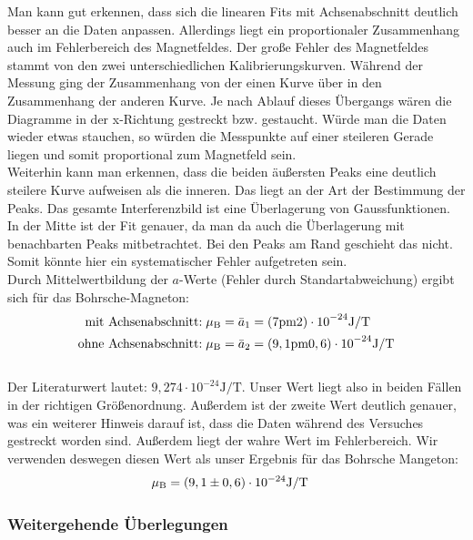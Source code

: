 Man kann gut erkennen, dass sich die linearen Fits mit Achsenabschnitt deutlich besser an die Daten anpassen. Allerdings liegt ein proportionaler Zusammenhang auch im Fehlerbereich des Magnetfeldes. Der große Fehler des Magnetfeldes stammt von den zwei unterschiedlichen Kalibrierungskurven. Während der Messung ging der Zusammenhang von der einen Kurve über in den Zusammenhang der anderen Kurve. Je nach Ablauf dieses Übergangs wären die Diagramme in der x-Richtung gestreckt bzw. gestaucht. Würde man die Daten wieder etwas stauchen, so würden die Messpunkte auf einer steileren Gerade liegen und somit proportional zum Magnetfeld sein.\\
Weiterhin kann man erkennen, dass die beiden äußersten Peaks eine deutlich steilere Kurve aufweisen als die inneren. Das liegt an der Art der Bestimmung der Peaks. Das gesamte Interferenzbild ist eine Überlagerung von Gaussfunktionen. In der Mitte ist der Fit genauer, da man da auch die Überlagerung mit benachbarten Peaks mitbetrachtet. Bei den Peaks am Rand geschieht das nicht. Somit könnte hier ein systematischer Fehler aufgetreten sein.\\
 
Durch Mittelwertbildung der $a$-Werte (Fehler durch Standartabweichung) ergibt sich für das Bohrsche-Magneton:\\
\begin{align*}
\text{mit Achsenabschnitt:}\;& \mu\ind{B} = \bar{a}_1 = \si{(7 \pm 2) \cdot 10^{-24} \joule/\tesla}\\
\text{ohne Achsenabschnitt:}\;& \mu\ind{B} = \bar{a}_2 = \si{(9,1 \pm 0,6) \cdot 10^{-24} \joule/\tesla}\\
\end{align*}\\
Der Literaturwert lautet: $9,274 \cdot 10^{-24} \si{\joule/\tesla}$\cite{konst}. Unser Wert liegt also in beiden Fällen in der richtigen Größenordnung. Außerdem ist der zweite Wert deutlich genauer, was ein weiterer Hinweis darauf ist, dass die Daten während des Versuches gestreckt worden sind. Außerdem liegt der wahre Wert im Fehlerbereich. Wir verwenden deswegen diesen Wert als unser Ergebnis für das Bohrsche Mangeton:
\begin{align*}
\mu\ind{B} &= (9,1 \pm 0,6) \cdot 10^{-24} \si{\joule/\tesla}
\end{align*}

\subsubsection{Weitergehende Überlegungen}
